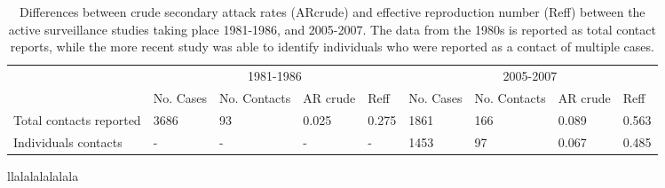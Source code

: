 
\begin{table} %

\centering %
\caption{Differences between crude secondary attack rates (ARcrude) and effective reproduction number (Reff) between the active surveillance studies taking place 1981-1986, and 2005-2007. The data from the 1980s is reported as total contact reports, while the more recent study was able to identify individuals who were reported as a contact of multiple cases.}
\begin{tabularx}{400pt}{lXXXXXXXX} %
\toprule %
& \multicolumn{4}{c}{1981-1986} & \multicolumn{4}{c}{2005-2007} \\ %
\cmidrule(r){2-5} %
\cmidrule(l){6-9}
 & No. Cases & No. Contacts & AR crude & Reff & No. Cases & No. Contacts & AR crude & Reff\\ %
\toprule %
Total contacts reported & 3686 & 93 & 0.025 & 0.275 & 1861 & 166 & 0.089 & 0.563\\ 
Individuals contacts & - & - & - & - & 1453 & 97 & 0.067 & 0.485\\
\bottomrule %
\end{tabularx}
\label{table1} %
\end{table}


llalalalalalala



